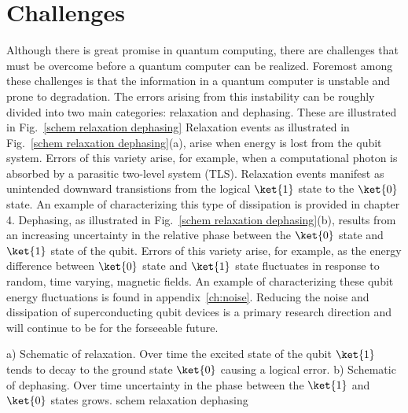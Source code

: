 \section{Challenges}
Although there is great promise in quantum computing, there are challenges that must be overcome before a quantum computer can be realized.
Foremost among these challenges is that the information in a quantum computer is unstable and prone to degradation.
The errors arising from this instability can be roughly divided into two main categories: relaxation and dephasing.
These are illustrated in Fig.~\ref{schem relaxation dephasing}
Relaxation events as illustrated in Fig.~\ref{schem relaxation dephasing}(a), arise when energy is lost from the qubit system.
Errors of this variety arise, for example, when a computational photon is absorbed by a parasitic two-level system (TLS).
Relaxation events manifest as unintended downward transistions from the logical $\ket{1}$ state to the $\ket{0}$ state.
An example of characterizing this type of dissipation is provided in chapter 4.
Dephasing, as illustrated in Fig.~\ref{schem relaxation dephasing}(b),
results from an increasing uncertainty in the relative phase between the $\ket{0}$ state and $\ket{1}$ state of the qubit.
Errors of this variety arise, for example, as the energy difference between $\ket{0}$ state and $\ket{1}$ state fluctuates in response to random,
time varying, magnetic fields.
An example of characterizing these qubit energy fluctuations is found in appendix~\ref{ch:noise}.
Reducing the noise and dissipation of superconducting qubit devices is a primary research direction and will continue to be for the forseeable future.

{
a) Schematic of relaxation.  Over time the excited state of the qubit $\ket{1}$ tends to decay to the ground state $\ket{0}$ causing a logical error.
b) Schematic of dephasing.  Over time uncertainty in the phase between the $\ket{1}$ and $\ket{0}$ states grows.
}
{schem relaxation dephasing}


